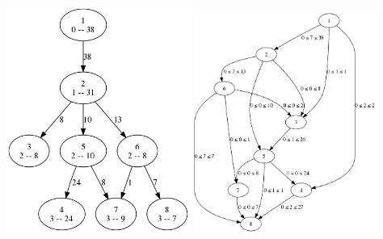   \includegraphics[width=0.45\textwidth]{img/2-level-graph.png}
  \includegraphics[width=0.45\textwidth]{img/3-graph.png}

